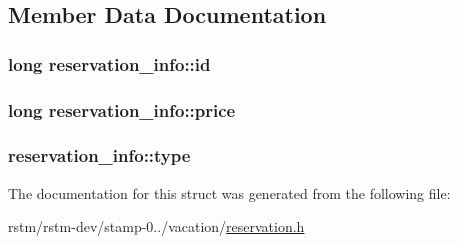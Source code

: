 \subsection{Member Data Documentation}
\hypertarget{structreservation__info_ad587fe253a7ae6c5ddda032796f0e494}{
\subsubsection[{id}]{\setlength{\rightskip}{0pt plus 5cm}long reservation\-\_\-info\-::id}}\label{structreservation__info_ad587fe253a7ae6c5ddda032796f0e494}
\hypertarget{structreservation__info_af03e586ff0e49ff03de46fa1f034ca5f}{
\subsubsection[{price}]{\setlength{\rightskip}{0pt plus 5cm}long reservation\-\_\-info\-::price}}\label{structreservation__info_af03e586ff0e49ff03de46fa1f034ca5f}
\hypertarget{structreservation__info_ad62e8cb09833d82e77f42d3536f13aeb}{
\subsubsection[{type}]{ reservation\-\_\-info\-::type}}\label{structreservation__info_ad62e8cb09833d82e77f42d3536f13aeb}


The documentation for this struct was generated from the following file\-:\begin{DoxyCompactItemize}
\item 
rstm/rstm-\/dev/stamp-\/0../vacation/\hyperlink{reservation_8h}{reservation.\-h}\end{DoxyCompactItemize}
